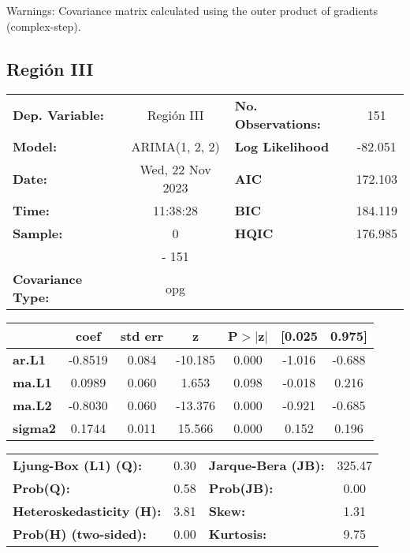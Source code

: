 \documentclass{article}%
\begin{document}
Warnings: \newline
 [1] Covariance matrix calculated using the outer product of gradients (complex-step).%
\subsection*{Región III}%
\begin{center}
\begin{tabular}{lclc}
\toprule
\textbf{Dep. Variable:}          &    Región III    & \textbf{  No. Observations:  } &    151      \\
\textbf{Model:}                  &  ARIMA(1, 2, 2)  & \textbf{  Log Likelihood     } &  -82.051    \\
\textbf{Date:}                   & Wed, 22 Nov 2023 & \textbf{  AIC                } &  172.103    \\
\textbf{Time:}                   &     11:38:28     & \textbf{  BIC                } &  184.119    \\
\textbf{Sample:}                 &        0         & \textbf{  HQIC               } &  176.985    \\
\textbf{}                        &       - 151      & \textbf{                     } &             \\
\textbf{Covariance Type:}        &       opg        & \textbf{                     } &             \\
\bottomrule
\end{tabular}
\begin{tabular}{lcccccc}
                & \textbf{coef} & \textbf{std err} & \textbf{z} & \textbf{P$> |$z$|$} & \textbf{[0.025} & \textbf{0.975]}  \\
\midrule
\textbf{ar.L1}  &      -0.8519  &        0.084     &   -10.185  &         0.000        &       -1.016    &       -0.688     \\
\textbf{ma.L1}  &       0.0989  &        0.060     &     1.653  &         0.098        &       -0.018    &        0.216     \\
\textbf{ma.L2}  &      -0.8030  &        0.060     &   -13.376  &         0.000        &       -0.921    &       -0.685     \\
\textbf{sigma2} &       0.1744  &        0.011     &    15.566  &         0.000        &        0.152    &        0.196     \\
\bottomrule
\end{tabular}
\begin{tabular}{lclc}
\textbf{Ljung-Box (L1) (Q):}     & 0.30 & \textbf{  Jarque-Bera (JB):  } & 325.47  \\
\textbf{Prob(Q):}                & 0.58 & \textbf{  Prob(JB):          } &  0.00   \\
\textbf{Heteroskedasticity (H):} & 3.81 & \textbf{  Skew:              } &  1.31   \\
\textbf{Prob(H) (two-sided):}    & 0.00 & \textbf{  Kurtosis:          } &  9.75   \\
\bottomrule
\end{tabular}
\end{center}
\end{document}
